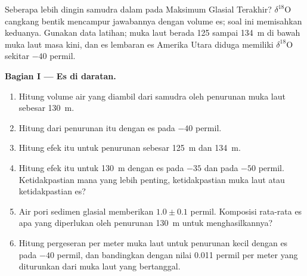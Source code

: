 \begin{problem}\label{pb:b2:climate-proxies:1}
Seberapa lebih dingin samudra dalam pada Maksimum Glasial Terakhir? $\delta^{18}$O cangkang bentik
mencampur jawabannya dengan volume es; soal ini memisahkan keduanya. Gunakan data
latihan; muka laut berada 125 sampai \qty{134}{m} di bawah muka laut masa kini, dan es lembaran es Amerika
Utara diduga memiliki $\delta^{18}$O sekitar $-40$ permil.

\medskip\noindent\textbf{Bagian I --- Es di daratan.}
\begin{enumerate}
  \item Hitung volume air yang diambil dari samudra oleh penurunan muka laut sebesar \qty{130}{m}.
  \item Hitung  dari penurunan itu dengan es pada $-40$ permil.
  \item Hitung efek itu untuk penurunan sebesar \qty{125}{m} dan \qty{134}{m}.
  \item Hitung efek itu untuk \qty{130}{m} dengan es pada $-35$ dan pada $-50$ permil. Ketidakpastian mana
        yang lebih penting, ketidakpastian muka laut atau ketidakpastian es?
  \item Air pori sedimen glasial memberikan $1.0 \pm 0.1$ permil. Komposisi rata-rata es
        apa yang diperlukan oleh penurunan \qty{130}{m} untuk menghasilkannya?
  \item Hitung pergeseran per meter muka laut untuk penurunan kecil dengan es pada $-40$ permil, dan
        bandingkan dengan nilai \num{0.011} permil per meter yang diturunkan dari muka laut yang bertanggal.
\end{enumerate}


\end{problem}
